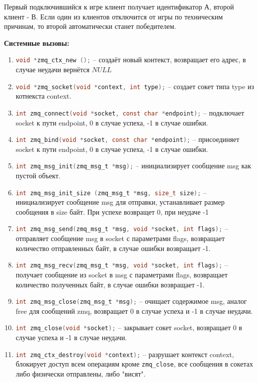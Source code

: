 \documentclass[12pt]{article}
\begin{document}
Первый подключившийся к игре клиент получает идентификатор А, второй клиент - В. Если один из клиентов отключится от игры по техническим причинам, то второй автоматически станет победителем.

{\bf Системные вызовы:}
\begin{enumerate}
    \item \lstinline[language=c]|void *zmq_ctx_new ();| -- создаёт новый контекст, возвращает его адрес, в случае неудачи вернётся $NULL$
    \item \lstinline[language=c]|void *zmq_socket(void *context, int type);| -- создает сокет типа type из котнекста context.
    \item \lstinline[language=c]|int zmq_connect(void *socket, const char *endpoint);| -- подключает socket к пути endpoint, 0 в случае успеха, -1 в случае ошибки.
    \item \lstinline[language=c]|int zmq_bind(void *socket, const char *endpoint);| -- присоединяет socket к пути endpoint, 0 в случае успеха, -1 в случае ошибки.
    \item \lstinline[language=c]|int zmq_msg_init(zmq_msg_t *msg);| -- инициализирует сообщение msg как пустой объект.
    \item \lstinline[language=c]|int zmq_msg_init_size (zmq_msg_t *msg, size_t size);| -- инициализирует сообщение msg для отправки, устанавливает размер сообщения в size байт. При успехе возвращет 0, при неудаче -1
    \item \lstinline[language=c]|int zmq_msg_send(zmq_msg_t *msg, void *socket, int flags);| -- отправляет сообщение msg в socket с параметрами flags, возвращает количество отправленных байт, в случае ошибки возвращает -1.
    \item \lstinline[language=c]|int zmq_msg_recv(zmq_msg_t *msg, void *socket, int flags);| -- получает сообщение из socket в msg с параметрами flags, возвращает количество полученных байт, в случае ошибки возвращает -1.
    \item \lstinline[language=c]|int zmq_msg_close(zmq_msg_t *msg);| -- очищает содержимое msg, аналог free для сообщений zmq, возвращает 0 в случае успеха и -1 в случае неудачи.
    \item \lstinline[language=c]|int zmq_close(void *socket);| -- закрывает сокет socket, возвращает 0 в случае успеха и -1 в случае неудачи.
    \item \lstinline[language=c]|int zmq_ctx_destroy(void *context);| -- разрушает контекст context, блокирует доступ всем операциям кроме \lstinline|zmq_close|, все сообщения в сокетах либо физически отправлены, либо "висят".
\end{enumerate}
\end{document}
